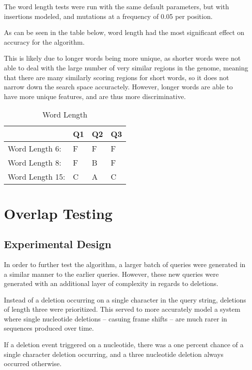 \documentclass[12pt, conference]{IEEEtran}
\begin{document}
	The word length tests were run with the same default parameters, but with insertions modeled, and mutations at a frequency of 0.05 per position.
	
	As can be seen in the table below, word length had the most significant effect on accuracy for the algorithm.
	
	This is likely due to longer words being more unique, as shorter words were not able to deal with the large number of very similar regions in the genome, meaning that there are many similarly scoring regions for short words, so it does not narrow down the search space accuractely. However, longer words are able to have more unique features, and are thus more discriminative. 
	
		\begin{table}[htbp]
	\centering
	\caption{Word Length}
	\label{wlen}
	\begin{tabular}{|l|l|l|l|}
	\hline
										 & Q1 & Q2 & Q3 \\ \hline
	Word Length 6:     &  F & F  & F \\ \hline
	Word Length 8:     &  F & B  & F  \\ \hline
	Word Length 15:    &  C & A  & C  \\ \hline
	\end{tabular}
	\end{table}

\section{\textbf{Overlap Testing}}
    
    \subsection{\textbf{Experimental Design}}

    In order to further test the algorithm, a larger batch of queries were generated in a similar manner to the earlier queries.
     However, these new queries were generated with an additional layer of complexity in regards to deletions.

     Instead of a deletion occurring on a single character in the query string, deletions of length three were prioritized. 
     This served to more accurately model a system where single nucleotide deletions -- casuing frame shifts -- are much rarer in sequences produced over time.

     If a deletion event triggered on a nucleotide, there was a one percent chance of a single character deletion occurring, and a three nucleotide deletion always occurred otherwise.
\end{document}
